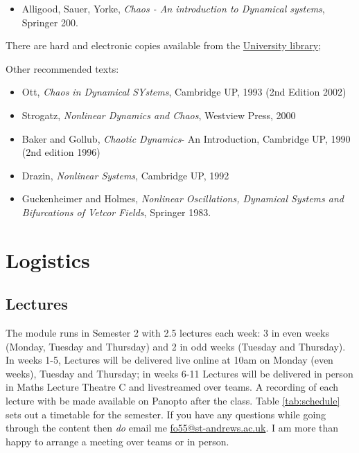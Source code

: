 \documentclass[
  a4paper,
  oneside,
  final]{krantz}
\providecommand{\tightlist}{%
  \setlength{\itemsep}{0pt}\setlength{\parskip}{0pt}}
\theoremstyle{definition}
\theoremstyle{definition}
\theoremstyle{definition}
\theoremstyle{definition}
\theoremstyle{remark}
\begin{document}
\begin{itemize}
\tightlist
\item
  Alligood, Sauer, Yorke, \emph{Chaos - An introduction to Dynamical systems}, Springer 200.
\end{itemize}

There are hard and electronic copies available from the \href{https://www.st-andrews.ac.uk/library/}{University library};

Other recommended texts:

\begin{itemize}
\tightlist
\item
  Ott, \emph{Chaos in Dynamical SYstems}, Cambridge UP, 1993 (2nd Edition 2002)
\item
  Strogatz, \emph{Nonlinear Dynamics and Chaos}, Westview Press, 2000
\item
  Baker and Gollub, \emph{Chaotic Dynamics}- An Introduction, Cambridge UP, 1990 (2nd edition 1996)
\item
  Drazin, \emph{Nonlinear Systems}, Cambridge UP, 1992
\item
  Guckenheimer and Holmes, \emph{Nonlinear Oscillations, Dynamical Systems and Bifurcations of Vetcor Fields}, Springer 1983.
\end{itemize}

\hypertarget{logistics}{%
\section*{Logistics}\label{logistics}}


\hypertarget{lectures}{%
\subsection*{Lectures}\label{lectures}}


The module runs in Semester 2 with 2.5 lectures each week: 3 in even weeks (Monday, Tuesday and Thursday) and 2 in odd weeks (Tuesday and Thursday). In weeks 1-5, Lectures will be delivered live online at 10am on Monday (even weeks), Tuesday and Thursday; in weeks 6-11 Lectures will be delivered in person in Maths Lecture Theatre C and livestreamed over teams. A recording of each lecture with be made available on Panopto after the class. Table \ref{tab:schedule} sets out a timetable for the semester. If you have any questions while going through the content then \emph{do} email me \url{fo55@st-andrews.ac.uk}. I am more than happy to arrange a meeting over teams or in person.
\end{document}
